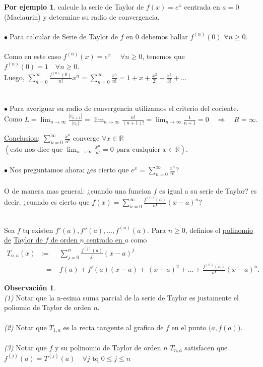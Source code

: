 \documentclass{article}
\theoremstyle{definition}
\newtheorem*{obs}{Observación}
\newtheorem*{ej}{Por ejemplo}
\theoremstyle{remark}
\newcommand\bl{$\bullet\;$}
\begin{document}
\begin{ej}
  calcule la serie de Taylor de $f(x)=e^x$ centrada en $a=0$ (Maclaurin) y determine su radio de convergencia.
\\\\
\bl Para calcular de Serie de Taylor de $f$ en $0$ debemos hallar $f^{(n)}(0)$ \quad $\forall  n \geq 0$. \\ \\
Como en este caso $f^{(n)}(x)=e^x$ $\quad \forall n \geq 0$, tenemos que $f^{(n)}(0)=1 \quad \forall n \geq 0$. \\
Luego, $\sum_{n=0}^{\infty}{\frac{f^{(n)}(0)}{n!}x^n=\sum_{n=0}^{\infty}{\frac{x^n}{n!}=1+x+\frac{x^2}{2!}+\frac{x^3}{3!}+\dots}}$
 \\ \\  \\
 \bl Para averiguar su radio de convergencia utilizamos el criterio del cociente. \\ 
 Como $L=\lim_{n\to\infty}{\frac{|c_{n+1}|}{|c_{n}|}}=\lim_{n\to\infty}{\frac{n!}{(n+1)!}}=\lim_{n\to\infty}{\frac{1}{n+1}=0} \quad \Rightarrow \quad R=\infty.$
\end{ej}

\underline{Conclusion}: $\sum_{n=0}^{\infty}{\frac{x^n}{n!}}$ converge $\forall x \in \mathbb{R}$ 
$\left(\text{esto nos dice que }\lim_{n\to\infty}{\frac{x^n}{n!}}=0\text{ para cualquier }x \in \mathbb{R}\right)$.
\\\\
\bl Nos preguntamos ahora: ¿es cierto que $e^x=\sum_{n=0}^{\infty}{\frac{x^n}{n!}}$? \\\\
O de manera mas general: ¿cuando una funcion $f$ es igual a su serie de Taylor? es decir, ¿cuando es cierto que $f(x)=\sum_{n=0}^{\infty}{\frac{f^{(n)}(a)}{n!}(x-a)^n}$?
\pagebreak
\begin{defi}
\; \\ 
Sea $f$ tq existen $f'(a), f''(a), \dots ,f^{(n)}(a).$ Para $n \geq 0$, definios el \underline{polinomio de} \underline{Taylor de $f$ de orden $n$ centrado en $a$} como \[ \begin{array}{lll}
T_{n,a}(x)& := & \sum_{j=0}^{n}{\frac{f^{(j)}(a)}{j!}(x-a)^j} \\ & \phantom{:}= & f(a)+f'(a)(x-a)+\frac{}{}(x-a)^2+\dots+\frac{f^{(n)}(a)}{n!}(x-a)^n. \end{array}
\]
\end{defi}

\begin{obs} \; \\
  \emph{(1)} Notar que la n-esima suma parcial de la serie de Taylor es justamente el poliomio de Taylor de orden $n$.
  \\\\
  \emph{(2)} Notar que $T_{1,a}$ es la recta tangente al grafico de $f$ en el punto $\big(a,f(a)\big)$.
  \\\\
  \emph{(3)} Notar que $f$ y su polinomio de Taylor de orden $n$ $T_{n,a}$ satisfacen que \\ $f^{(j)}(a)=T^{(j)}(a)\quad \forall j \text{ tq }0 \leq j \leq n$
\end{obs}
\end{document}
